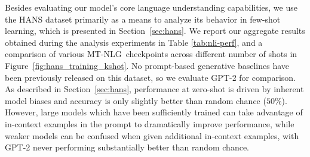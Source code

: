 \documentclass[11pt]{article}
\newcommand{\ours}{MT-NLG}
\begin{document}
Besides evaluating our model's core language understanding capabilities, we use the HANS dataset primarily as a means to analyze its behavior in few-shot learning, which is presented in Section~\ref{sec:hans}. We report our aggregate results obtained during the analysis experiments in Table \ref{tab:nli-perf}, and a comparison of various \ours~checkpoints across different number of shots in Figure~\ref{fig:hans_training_kshot}. No prompt-based generative baselines have been previously released on this dataset, so we evaluate GPT-2 for comparison. As described in Section~\ref{sec:hans}, performance at zero-shot is driven by inherent model biases and accuracy is only slightly better than random chance ($50\%$). However, large models which have been sufficiently trained can take advantage of in-context examples in the prompt to dramatically improve performance, while weaker models can be confused when given additional in-context examples, with GPT-2 never performing substantially better than random chance.


\end{document}
